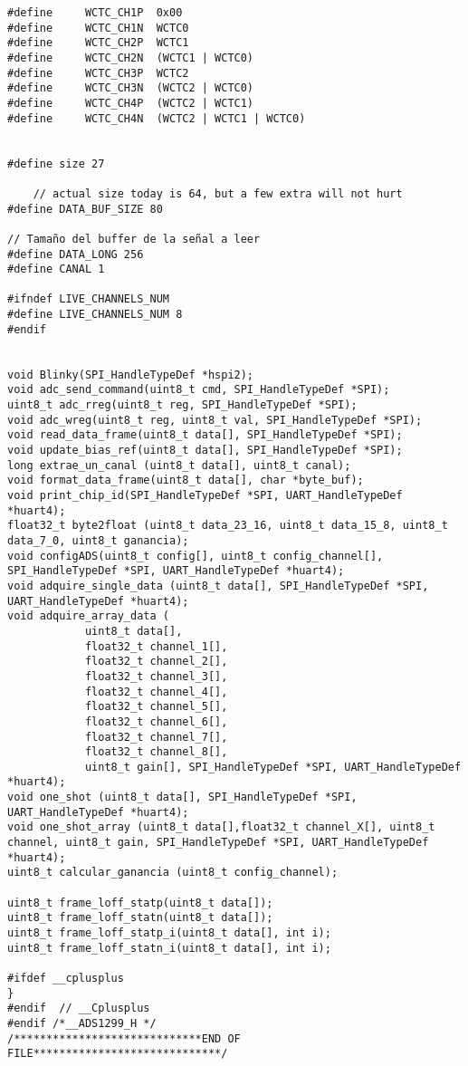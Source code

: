 \begin{lstlisting}[label=algoritmo:STM32F4:ADS1299.h,style = STM-code,frame=single,caption=STM32F4:ADS1299.h]
#define		WCTC_CH1P  0x00
#define		WCTC_CH1N  WCTC0
#define		WCTC_CH2P  WCTC1
#define		WCTC_CH2N  (WCTC1 | WCTC0)
#define		WCTC_CH3P  WCTC2
#define		WCTC_CH3N  (WCTC2 | WCTC0)
#define		WCTC_CH4P  (WCTC2 | WCTC1)
#define		WCTC_CH4N  (WCTC2 | WCTC1 | WCTC0)

	
#define size 27

	// actual size today is 64, but a few extra will not hurt
#define DATA_BUF_SIZE 80

// Tamaño del buffer de la señal a leer
#define DATA_LONG 256
#define CANAL 1

#ifndef LIVE_CHANNELS_NUM
#define LIVE_CHANNELS_NUM 8
#endif
		

void Blinky(SPI_HandleTypeDef *hspi2);
void adc_send_command(uint8_t cmd, SPI_HandleTypeDef *SPI);
uint8_t adc_rreg(uint8_t reg, SPI_HandleTypeDef *SPI);
void adc_wreg(uint8_t reg, uint8_t val, SPI_HandleTypeDef *SPI);
void read_data_frame(uint8_t data[], SPI_HandleTypeDef *SPI);
void update_bias_ref(uint8_t data[], SPI_HandleTypeDef *SPI);
long extrae_un_canal (uint8_t data[], uint8_t canal);
void format_data_frame(uint8_t data[], char *byte_buf);
void print_chip_id(SPI_HandleTypeDef *SPI, UART_HandleTypeDef *huart4);
float32_t byte2float (uint8_t data_23_16, uint8_t data_15_8, uint8_t data_7_0, uint8_t ganancia);
void configADS(uint8_t config[], uint8_t config_channel[], SPI_HandleTypeDef *SPI, UART_HandleTypeDef *huart4);
void adquire_single_data (uint8_t data[], SPI_HandleTypeDef *SPI, UART_HandleTypeDef *huart4);
void adquire_array_data ( 
			uint8_t data[], 
			float32_t channel_1[],
			float32_t channel_2[],
			float32_t channel_3[],
			float32_t channel_4[],
			float32_t channel_5[],
			float32_t channel_6[],
			float32_t channel_7[],
			float32_t channel_8[], 
			uint8_t gain[], SPI_HandleTypeDef *SPI, UART_HandleTypeDef *huart4);
void one_shot (uint8_t data[], SPI_HandleTypeDef *SPI, UART_HandleTypeDef *huart4);
void one_shot_array (uint8_t data[],float32_t channel_X[], uint8_t channel, uint8_t gain, SPI_HandleTypeDef *SPI, UART_HandleTypeDef *huart4);
uint8_t calcular_ganancia (uint8_t config_channel);

uint8_t frame_loff_statp(uint8_t data[]);
uint8_t frame_loff_statn(uint8_t data[]);
uint8_t frame_loff_statp_i(uint8_t data[], int i);
uint8_t frame_loff_statn_i(uint8_t data[], int i);

#ifdef __cplusplus
}
#endif	// __Cplusplus
#endif /*__ADS1299_H */
/*****************************END OF FILE*****************************/

\end{lstlisting}



